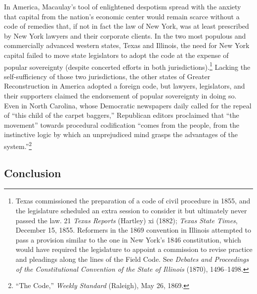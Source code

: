 \documentclass[12pt,]{article}
\let\rmarkdownfootnote\footnote%
\def\footnote{\protect\rmarkdownfootnote}
\begin{document}
In America, Macaulay's tool of enlightened despotism spread with the
anxiety that capital from the nation's economic center would remain
scarce without a code of remedies that, if not in fact the law of New
York, was at least prescribed by New York lawyers and their corporate
clients. In the two most populous and commercially advanced western
states, Texas and Illinois, the need for New York capital failed to move
state legislators to adopt the code at the expense of popular
sovereignty (despite concerted efforts in both jurisdictions).\footnote{Texas
  commissioned the preparation of a code of civil procedure in 1855, and
  the legislature scheduled an extra session to consider it but
  ultimately never passed the law. 21 \emph{Texas Reports} (Hartley) xi
  (1882); \emph{Texas State Times}, December 15, 1855. Reformers in the
  1869 convention in Illinois attempted to pass a provision similar to
  the one in New York's 1846 constitution, which would have required the
  legislature to appoint a commission to revise practice and pleadings
  along the lines of the Field Code. See \emph{Debates and Proceedings
  of the Constitutional Convention of the State of Illinois} (1870),
  1496--1498.} Lacking the self-sufficiency of those two jurisdictions,
the other states of Greater Reconstruction in America adopted a foreign
code, but lawyers, legislators, and their supporters claimed the
endorsement of popular sovereignty in doing so. Even in North Carolina,
whose Democratic newspapers daily called for the repeal of ``this child
of the carpet baggers,'' Republican editors proclaimed that ``the
movement'' towards procedural codification ``comes from the people, from
the instinctive logic by which an unprejudiced mind grasps the
advantages of the system.''\footnote{``The Code,'' \emph{Weekly
  Standard} (Raleigh), May 26, 1869.}

\hypertarget{conclusion}{%
\subsection{Conclusion}\label{conclusion}}
\end{document}
